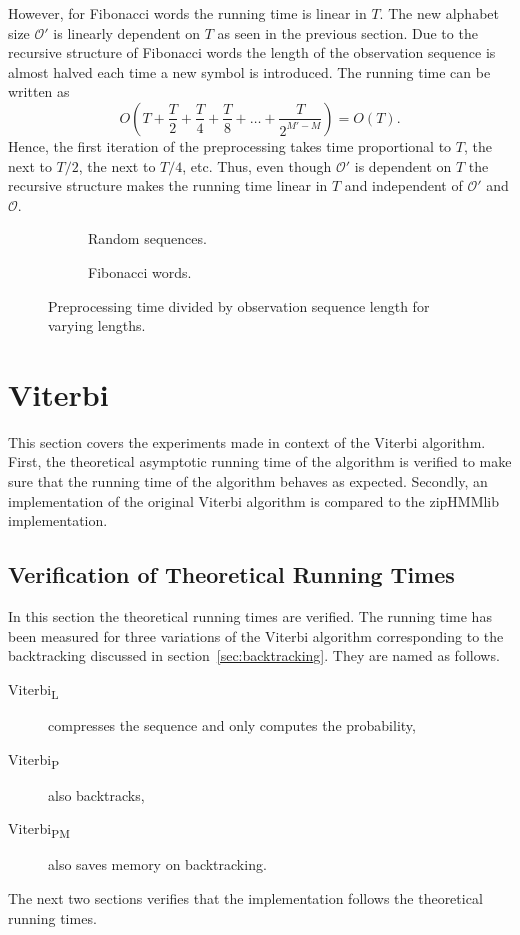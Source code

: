 However, for Fibonacci words the running time is linear in $T$. The new
alphabet size $\mathcal{O'}$ is linearly dependent on $T$ as seen in the
previous section. Due to the recursive structure of Fibonacci words the length
of the observation sequence is almost halved each time a new symbol is
introduced. The running time can be written as
\begin{equation*}
  O(T + \frac{T}{2} + \frac{T}{4} + \frac{T}{8} + \dots + \frac{T}{2^{M' - M}}) = O(T).
\end{equation*}
Hence, the first iteration of the preprocessing takes time proportional to $T$,
the next to $T/2$, the next to $T/4$, etc. Thus, even though $\mathcal{O'}$
is dependent on $T$ the recursive structure makes the running time linear in
$T$ and independent of $\mathcal{O'}$ and $\mathcal{O}$.

\begin{figure}
  \centering
  \begin{subfigure}[b]{0.5\textwidth}
    \centering 
    \caption{Random sequences.}
  \end{subfigure}\hspace{-5mm}%
  \begin{subfigure}[b]{0.5\textwidth}
    \centering 
    \caption{Fibonacci words.}
  \end{subfigure}
  \caption{Preprocessing time divided by observation sequence length for
    varying lengths.}
  \label{fig:pre_viterbi_T}
\end{figure}

\section{Viterbi}

This section covers the experiments made in context of the Viterbi algorithm.
First, the theoretical asymptotic running time of the algorithm is verified to
make sure that the running time of the algorithm behaves as expected. Secondly,
an implementation of the original Viterbi algorithm is compared to the
zipHMMlib implementation.

\subsection{Verification of Theoretical Running Times}
\label{sec:theor-runn-times}

In this section the theoretical running times are verified. The running time
has been measured for three variations of the Viterbi algorithm corresponding
to the backtracking discussed in section~\ref{sec:backtracking}. They are named
as follows.
\begin{description}
\item[Viterbi\textsubscript{L}] compresses the sequence and only computes the
  probability,
\item[Viterbi\textsubscript{P}] also backtracks,
\item[Viterbi\textsubscript{PM}] also saves memory on backtracking.
\end{description}
The next two sections verifies that the implementation follows the theoretical
running times.


